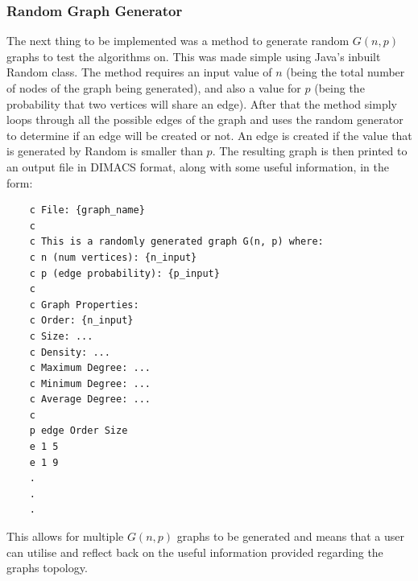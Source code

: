 \subsubsection{Random Graph Generator}

The next thing to be implemented was a method to generate random $G(n,p)$ graphs to test the algorithms on. This was made simple using  Java's inbuilt Random class. The method requires an input value of $n$ (being the total number of nodes of the graph being generated), and also a value for $p$ (being the probability that two vertices will share an edge). After that the method simply loops through all the possible edges of the graph and uses the random generator to determine if an edge will be created or not. An edge is created if the value that is generated by Random is smaller than $p$. The resulting graph is then printed to an output file in DIMACS format, along with some useful information, in the form:
\begin{verbatim}
    c File: {graph_name}
    c 
    c This is a randomly generated graph G(n, p) where: 
    c n (num vertices): {n_input}
    c p (edge probability): {p_input}
    c 
    c Graph Properties: 
    c Order: {n_input}
    c Size: ...
    c Density: ...
    c Maximum Degree: ...
    c Minimum Degree: ...
    c Average Degree: ...
    c 
    p edge Order Size
    e 1 5
    e 1 9
    .
    .
    .
\end{verbatim}

This allows for multiple $G(n,p)$ graphs to be generated and means that a user can utilise and reflect back on the useful information provided regarding the graphs topology. 

